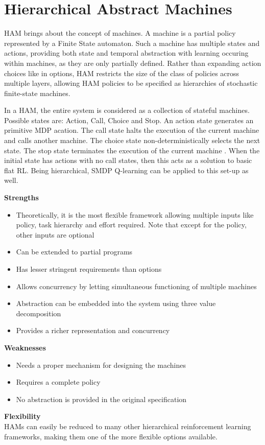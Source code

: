 \section{Hierarchical Abstract Machines}

HAM brings about the concept of machines. A machine is a partial policy
represented by a Finite State automaton. Such a machine has multiple states
and actions, providing both state and temporal abstraction with learning occuring
within machines, as they are only partially defined. Rather than expanding
action choices like in options, HAM restricts the size of
the class of policies across multiple layers, allowing HAM policies
to be specified as  hierarchies of stochastic finite-state machines.

In a HAM, the entire system is considered as a collection of stateful machines.
Possible states are: Action, Call, Choice and Stop. An action state generates
an primitive MDP acation. The call state halts the
execution of the current machine and calls another
machine. The choice state non-deterministically selects the next state. The
stop state terminates the execution of the current machine \cite{Parr}. When
the initial state has actions with no
call states, then this acts as a solution to basic flat RL. Being
hierarchical, SMDP Q-learning can be applied to this set-up as well.

\textbf{Strengths}
\begin{itemize}
    \item Theoretically, it is the most flexible framework allowing multiple inputs like policy, task hierarchy and effort required. Note that except for the policy, other inputs are optional
    \item Can be extended to partial programs
    \item Has lesser stringent requirements than options
    \item Allows concurrency by letting simultaneous functioning of multiple machines
    \item Abstraction can be embedded into the system using three value decomposition
    \item Provides a richer representation and concurrency
\end{itemize}

\textbf{Weaknesses}
\begin{itemize}
    \item Needs a proper mechanism for designing the machines
    \item Requires a complete policy
    \item No abstraction is provided in the original specification
\end{itemize}

\textbf{Flexibility}\\
HAMs can easily be reduced to many other hierarchical reinforcement learning
frameworks, making them one of the more flexible options available.
